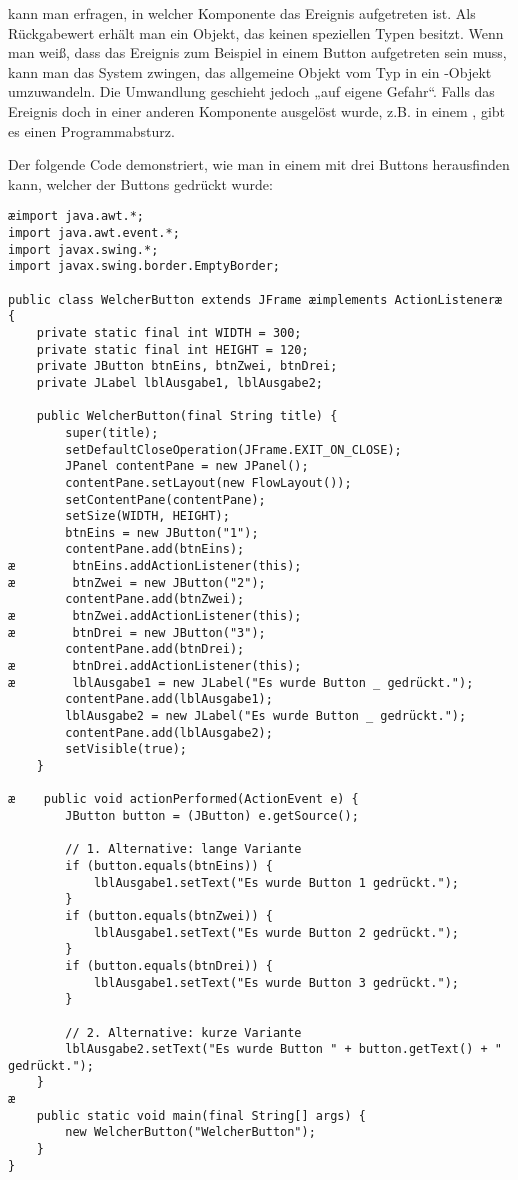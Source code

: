 kann man erfragen, in welcher Komponente das Ereignis aufgetreten ist. Als
Rückgabewert erhält man ein Objekt, das keinen speziellen Typen besitzt. Wenn
man weiß, dass das Ereignis zum Beispiel in einem Button aufgetreten sein muss,
kann man das System zwingen, das allgemeine Objekt vom Typ  in
ein -Objekt umzuwandeln. Die Umwandlung geschieht jedoch „auf
eigene Gefahr“. Falls das Ereignis doch in einer anderen Komponente ausgelöst
wurde, z.B. in einem , gibt es einen Programmabsturz.

Der folgende Code demonstriert, wie man in einem  mit drei
Buttons herausfinden kann, welcher der Buttons gedrückt wurde:

\begin{lstlisting}
æimport java.awt.*;
import java.awt.event.*;
import javax.swing.*;
import javax.swing.border.EmptyBorder;

public class WelcherButton extends JFrame æimplements ActionListeneræ {
    private static final int WIDTH = 300;
    private static final int HEIGHT = 120;
    private JButton btnEins, btnZwei, btnDrei;
    private JLabel lblAusgabe1, lblAusgabe2;

    public WelcherButton(final String title) {
        super(title);
        setDefaultCloseOperation(JFrame.EXIT_ON_CLOSE);
        JPanel contentPane = new JPanel();
        contentPane.setLayout(new FlowLayout());
        setContentPane(contentPane);
        setSize(WIDTH, HEIGHT);
        btnEins = new JButton("1");
        contentPane.add(btnEins);
æ        btnEins.addActionListener(this);
æ        btnZwei = new JButton("2");
        contentPane.add(btnZwei);
æ        btnZwei.addActionListener(this);
æ        btnDrei = new JButton("3");
        contentPane.add(btnDrei);
æ        btnDrei.addActionListener(this);
æ        lblAusgabe1 = new JLabel("Es wurde Button _ gedrückt.");
        contentPane.add(lblAusgabe1);
        lblAusgabe2 = new JLabel("Es wurde Button _ gedrückt.");
        contentPane.add(lblAusgabe2);
        setVisible(true);
    }

æ    public void actionPerformed(ActionEvent e) {
        JButton button = (JButton) e.getSource();

        // 1. Alternative: lange Variante
        if (button.equals(btnEins)) {
            lblAusgabe1.setText("Es wurde Button 1 gedrückt.");
        }
        if (button.equals(btnZwei)) {
            lblAusgabe1.setText("Es wurde Button 2 gedrückt.");
        }
        if (button.equals(btnDrei)) {
            lblAusgabe1.setText("Es wurde Button 3 gedrückt.");
        }

        // 2. Alternative: kurze Variante
        lblAusgabe2.setText("Es wurde Button " + button.getText() + " gedrückt.");
    }
æ
    public static void main(final String[] args) {
        new WelcherButton("WelcherButton");
    }
}
\end{lstlisting}


